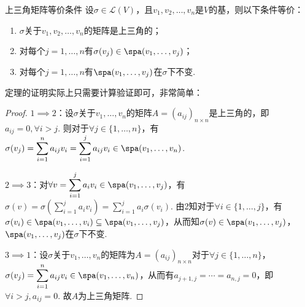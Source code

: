 \begin{theorem}{}{上三角矩阵等价条件}
    设$\sigma\in \mathcal{L}(V)$，且$v_1,v_2,\ldots,v_n$是$V$的基，则以下条件等价：
    \begin{enumerate}
        \item $\sigma$关于$v_1,v_2,\ldots,v_n$的矩阵是上三角的；

        \item 对每个$j=1,\ldots,n$有$\sigma(v_j)\in\spa(v_1,\ldots,v_j)$；

        \item 对每个$j=1,\ldots,n$有$\spa(v_1,\ldots,v_j)$在$\sigma$下不变.
    \end{enumerate}
\end{theorem}
定理的证明实际上只需要计算验证即可，非常简单：
\begin{proof}
$1 \implies 2$：设$\sigma$关于$v_1,\ldots,v_n$的矩阵$A=(a_{ij})_{n\times n}$是上三角的，即$a_{ij}=0,\forall i>j$. 则对于$\forall j \in \{1,\ldots,n\}$，有$\sigma(v_j)=\displaystyle\sum_{i=1}^{n}a_{ij}v_i=\displaystyle\sum_{i=1}^{j}a_{ij}v_i\in  \spa(v_1,\ldots,v_n)$.

$2 \implies 3$：对$\forall v=\displaystyle\sum_{i=1}^{j}a_iv_i \in \spa(v_1,\ldots,v_j)$，有$\sigma(v)=\sigma(\displaystyle\sum_{i=1}^{j}a_iv_i)=\displaystyle\sum_{i=1}^{j}a_i\sigma(v_i)$.
由2知对于$\forall i \in \{1,\ldots,j\}$，有$\sigma(v_i) \in \spa(v_1,\ldots,v_i) \subseteq \spa(v_1,\ldots,v_j)$，从而知$\sigma(v) \in \spa(v_1,\ldots,v_j)$，$\spa(v_1,\ldots,v_j)$在$\sigma$下不变.

$3 \implies 1$：设$\sigma$关于$v_1,\ldots,v_n$的矩阵为$A=(a_{ij})_{n\times n}$对于$\forall j \in \{1,\ldots,n\}$，$\sigma(v_j)=\displaystyle\sum_{i=1}^{n}a_{ij}v_i\in \spa(v_1,\ldots,v_n)$，从而有$a_{j+1,j}=\cdots=a_{n,j}=0$，即$\forall i>j,a_{ij}=0$. 故$A$为上三角矩阵.
\end{proof}

